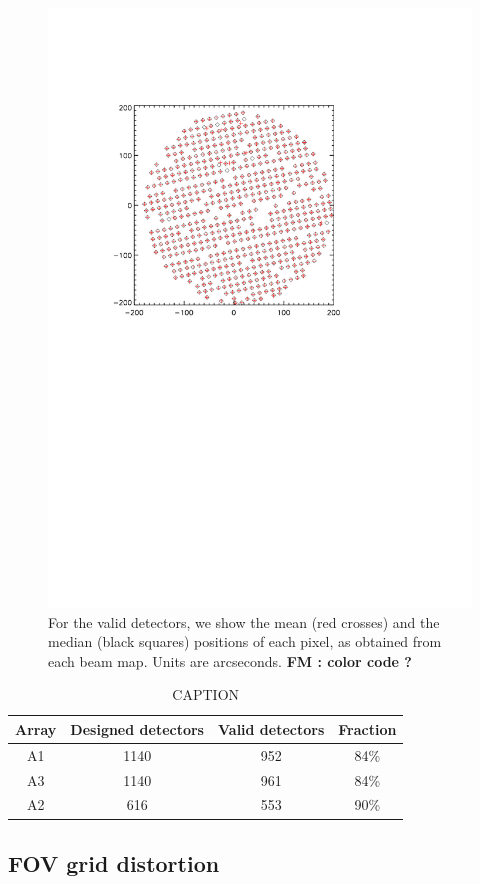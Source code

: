 \begin{figure}[htp]
\begin{center}
\includegraphics[trim=2cm 14cm 5cm 4cm, clip=true,width=0.55\linewidth]{Figures/A2_test_positions.pdf}
\caption{For the valid detectors,
  we show the mean (red crosses) and the median (black squares)
  positions of each pixel, as obtained from each beam map.
  Units are arcseconds. {\bf FM : color code ?}}
\label{fig:mean_vs_median}
\end{center}
\end{figure}


\begin{table}[ht]
\begin{center}  
  \begin{tabular}{|c|c|c|c|}
    \hline
    Array & Designed detectors &  Valid detectors & Fraction\\
    \hline\hline
    A1 & 1140 & 952 &  84\%\\
    A3 & 1140 & 961 &  84\%\\
    A2 & 616  & 553 &  90\%\\
    \hline
  \end{tabular}
  \caption{ CAPTION}
  \label{tab:number_of_kids}
\end{center}    
\end{table}




\subsection{FOV grid distortion}
\label{se:grid_distortion}

